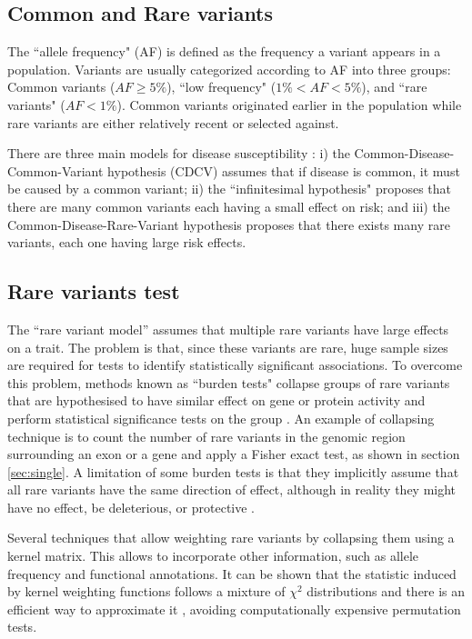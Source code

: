 \subsection{Common and Rare variants\label{sec:comonrare}}

The ``allele frequency" (AF) is defined as the frequency a variant appears in a population. 
Variants are usually categorized according to AF into three groups: Common variants ($AF \geq 5\%$), ``low frequency" ($1\% < AF < 5\%$), and ``rare variants" ($AF < 1\%$). 
Common variants originated earlier in the population while rare variants are either relatively recent or selected against.

There are three main models for disease susceptibility  \cite{hartl1997principles, gibson2012rare}:
i) the Common-Disease-Common-Variant hypothesis (CDCV) assumes that if disease is common, it must be caused by a common variant; 
ii) the ``infinitesimal hypothesis" proposes that there are many common variants each having a small effect on risk; and 
iii) the Common-Disease-Rare-Variant hypothesis proposes that there exists many rare variants, each one having large risk effects.

\subsection{Rare variants test}

The ``rare variant model'' assumes that multiple rare variants have large effects on a trait. 
The problem is that, since these variants are rare, huge sample sizes are required for tests to identify statistically significant associations. 
To overcome this problem, methods known as ``burden tests" collapse groups of rare variants that are hypothesised to have  similar effect on gene or protein activity and perform statistical significance tests on the group \cite{li2008methods}. 
An example of collapsing technique is to count the number of rare variants in the genomic region surrounding an exon or a gene and apply a Fisher exact test, as shown in section \ref{sec:single}. 
A limitation of some burden tests is that they implicitly assume that all rare variants have the same direction of effect, although in reality they might have no effect, be deleterious, or protective \cite{li2008methods,wu2011rare}.

Several techniques that allow weighting rare variants by collapsing them using a kernel matrix. 
This allows to incorporate other information, such as allele frequency and functional annotations. 
It can be shown that the statistic induced by kernel weighting functions follows a mixture of $\chi^2$ distributions and there is an efficient way to approximate it \cite{li2008methods,wu2011rare}, avoiding computationally expensive permutation tests.
